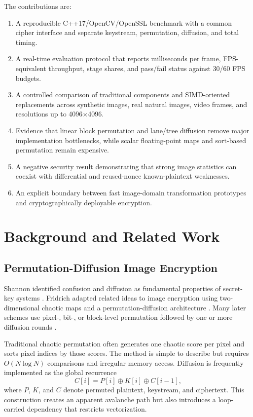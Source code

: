 \documentclass[twocolumn,runningheads]{svjour3}
\begin{document}
The contributions are:
\begin{enumerate}
\item A reproducible C++17/OpenCV/OpenSSL benchmark with a common cipher
interface and separate keystream, permutation, diffusion, and total timing.
\item A real-time evaluation protocol that reports milliseconds per frame,
FPS-equivalent throughput, stage shares, and pass/fail status against 30/60
FPS budgets.
\item A controlled comparison of traditional components and SIMD-oriented
replacements across synthetic images, real natural images, video frames, and
resolutions up to 4096$\times$4096.
\item Evidence that linear block permutation and lane/tree diffusion remove
major implementation bottlenecks, while scalar floating-point maps and
sort-based permutation remain expensive.
\item A negative security result demonstrating that strong image statistics
can coexist with differential and reused-nonce known-plaintext weaknesses.
\item An explicit boundary between fast image-domain transformation prototypes
and cryptographically deployable encryption.
\end{enumerate}

\section{Background and Related Work}
\label{sec:background}

\subsection{Permutation-Diffusion Image Encryption}
Shannon identified confusion and diffusion as fundamental properties of
secret-key systems \cite{shannon1949}. Fridrich adapted related ideas to image
encryption using two-dimensional chaotic maps and a permutation-diffusion
architecture \cite{fridrich1998}. Many later schemes use pixel-, bit-, or
block-level permutation followed by one or more diffusion rounds
\cite{fu2014,huang2018}.

Traditional chaotic permutation often generates one chaotic score per pixel
and sorts pixel indices by those scores. The method is simple to describe but
requires $O(N\log N)$ comparisons and irregular memory access. Diffusion is
frequently implemented as the global recurrence
\begin{equation}
C[i] = P[i] \oplus K[i] \oplus C[i-1],
\label{eq:global-chain}
\end{equation}
where $P$, $K$, and $C$ denote permuted plaintext, keystream, and ciphertext.
This construction creates an apparent avalanche path but also introduces a
loop-carried dependency that restricts vectorization.
\end{document}
